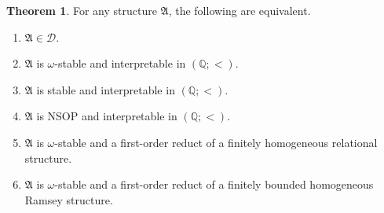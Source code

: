 \documentclass{amsart}
\theoremstyle{definition}
\newtheorem{theorem}{Theorem}[section]
\theoremstyle{remark}
\numberwithin{equation}{section}
\newcommand\green[1]{\textcolor{green!50!black}{#1}}
\newcommand{\fa}{\mathfrak{A}}
\newcommand{\pau}[1]{\textcolor{blue}{#1}}
\begin{document}
\begin{theorem}%
\label{lachlan_extra}
	For any structure $\fa$, the following are equivalent.
\begin{enumerate}
\item\label{it:d} $\fa\in \mathcal{D}$.
\item\label{it:omega_stab} $\fa$ is $\omega$-stable and interpretable in  $({\mathbb Q};<)$.
\item\label{it:stab} $\fa$ is stable and interpretable in  $({\mathbb Q};<)$.
\item\label{it:nsop} $\fa$ is NSOP and interpretable in  $({\mathbb Q};<)$. 
\item\label{it:hom} $\fa$ is $\omega$-stable and a first-order reduct of a finitely homogeneous relational structure. 
\item\label{it:homramsey} $\fa$ is $\omega$-stable and a first-order reduct of a finitely bounded homogeneous Ramsey structure. 
\end{enumerate}
\end{theorem}
\end{document}
